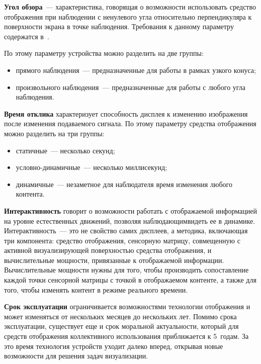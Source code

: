 \begin{multicols}{2}
     \textbf{Угол обзора}~--- характеристика, говорящая о возможности 
использовать средство отображения при наблюдении с ненулевого угла 
относительно перпендикуляра к поверхности экрана в точке наблюдения. 
Требования к данному параметру содержатся в~\cite{15chu, 16chu}. 
   
   По этому параметру устройства можно разделить на две группы:
   \begin{itemize}
\item прямого наблюдения~--- предназначенные для работы в рамках 
узкого конуса;
\item произвольного наблюдения~--- предназначенные для работы с 
любого угла наблюдения. 
\end{itemize}

     \textbf{Время отклика} характеризует способность дисплея к 
изменению изображения после изменения подаваемого сигнала. По этому 
параметру средства отображения можно разделить на три группы: 
     \begin{itemize}
\item статичные~--- несколько секунд;
\item условно-динамичные~--- несколько миллисекунд;
\item динамичные~--- незаметное для наблюдателя время изменения 
любого контента.
\end{itemize}

   \textbf{Интерактивность} говорит о возможности работать с 
отображаемой информацией на уровне естественных движений, позволяя 
наблюдающим\linebreak видеть ее в динамике. Интерактивность~--- это не свойство 
самих дисплеев, а методика, включающая три компонента: средство 
отображения, сенсорную матрицу, совмещенную с активной 
визуализирующей поверхностью средства отображения, и вычислительные 
мощности, привязанные к отображаемой информации. Вычислительные 
мощности нужны для того, чтобы производить сопоставление каждой точки 
сенсорной матрицы с точкой в отображаемом контенте, а также для того, 
чтобы изменять контент в режиме реального времени.

   \textbf{Срок эксплуатации} ограничивается возможностями технологии 
отображения и может изменяться от нескольких месяцев до нескольких лет. 
Помимо срока эксплуатации, существует еще и срок моральной 
актуальности, который для средств отображения коллективного 
использования приближается к 5~годам. За это время технология устройств 
уходит далеко вперед, открывая новые возможности для решения задач 
визуализации. 


\end{multicols}
